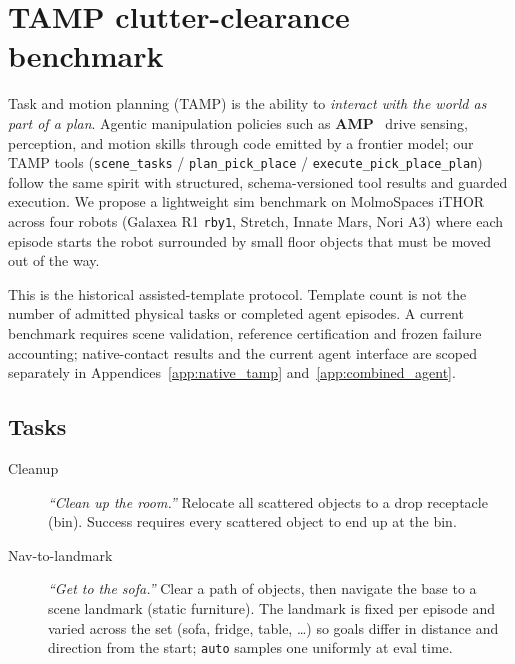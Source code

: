 
\section{TAMP clutter-clearance benchmark}
\label{app:tamp_clutter}

Task and motion planning (TAMP) is the ability to \emph{interact with the world as part
of a plan}. Agentic manipulation policies such as \textbf{AMP}~\citep{chen2026amp} drive
sensing, perception, and motion skills through code emitted by a frontier model; our TAMP
tools (\texttt{scene\_tasks} / \texttt{plan\_pick\_place} / \texttt{execute\_pick\_place\_plan})
follow the same spirit with structured, schema-versioned tool results and guarded execution.
We propose a lightweight sim benchmark on MolmoSpaces iTHOR across four
robots (Galaxea R1 \texttt{rby1}, Stretch, Innate Mars, Nori A3) where each episode
starts the robot surrounded by small floor objects that must be moved out of the way.

This is the historical assisted-template protocol. Template count is not the
number of admitted physical tasks or completed agent episodes. A current
benchmark requires scene validation, reference certification and frozen failure
accounting; native-contact results and the current agent interface are scoped
separately in Appendices~\ref{app:native_tamp} and~\ref{app:combined_agent}.

\subsection{Tasks}
\begin{description}
  \item[Cleanup] \emph{``Clean up the room.''} Relocate all scattered objects to a drop
    receptacle (bin). Success requires every scattered object to end up at the bin.
  \item[Nav-to-landmark] \emph{``Get to the sofa.''} Clear a path of objects, then navigate
    the base to a scene landmark (static furniture). The landmark is fixed per episode and
    varied across the set (sofa, fridge, table, \ldots) so goals differ in distance and
    direction from the start; \texttt{auto} samples one uniformly at eval time.
\end{description}


